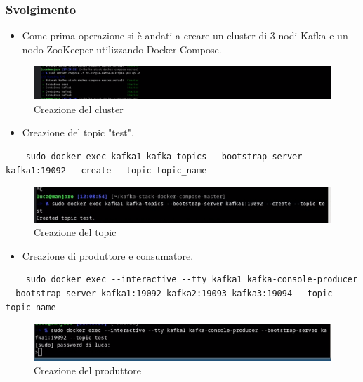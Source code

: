 \documentclass{article}
\begin{document}
\subsubsection{Svolgimento}
\begin{itemize}
    \item Come prima operazione si è andati a creare un cluster di 3 nodi Kafka e un nodo ZooKeeper utilizzando Docker Compose.
\end{itemize}

\begin{figure}[H]
    \centering
    \includegraphics[scale=0.5]{images/cluster.png}
    \caption{Creazione del cluster}
    \label{fig:my_label}
\end{figure}
\begin{itemize}
    \item Creazione del topic "test".
\end{itemize}
\begin{lstlisting}
    sudo docker exec kafka1 kafka-topics --bootstrap-server kafka1:19092 --create --topic topic_name
\end{lstlisting}
\begin{figure}[H]
    \centering
    \includegraphics[scale=0.5]{images/create_topic.png}
    \caption{Creazione del topic}
    \label{fig:my_label}
\end{figure}
\begin{itemize}
    \item Creazione di produttore e consumatore.
\end{itemize}
\begin{lstlisting}
    sudo docker exec --interactive --tty kafka1 kafka-console-producer --bootstrap-server kafka1:19092 kafka2:19093 kafka3:19094 --topic topic_name 
\end{lstlisting}
\begin{figure}[H]
    \centering
    \includegraphics[scale=0.5]{images/produttore.png}
    \caption{Creazione del produttore}
    \label{fig:my_label}
\end{figure}
\end{document}
